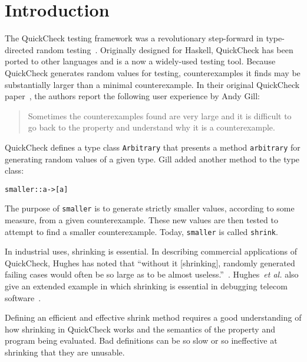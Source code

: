 \documentclass{sigplanconf}
\newenvironment{code}{\begin{alltt}\footnotesize}{\end{alltt}}
\newcommand{\ttp}[1]{\texttt{#1}}
\begin{document}
\section{Introduction}\label{sec:intro}
The QuickCheck testing framework was a revolutionary step-forward in
type-directed random testing~\cite{qc,monadic}.  Originally designed for Haskell,
QuickCheck has been ported to other languages and is a now a widely-used testing
tool.  Because QuickCheck generates random values for testing, counterexamples
it finds may be substantially larger than a minimal counterexample.  In their
original QuickCheck paper~\cite{qc}, the authors report the following user
experience by Andy Gill:
%
\begin{quote}
Sometimes the counterexamples found are very large and it is difficult to go
back to the property and understand why it is a counterexample.
\end{quote}
%
\noindent
QuickCheck defines a type class \ttp{Arbitrary} that presents a method
\ttp{arbitrary} for generating random values of a given type.  Gill added another
method to the type class:
%
\begin{code}
smaller :: a -> [a]
\end{code}
%
\noindent
The purpose of \ttp{smaller} is to generate strictly smaller values, according
to some measure, from a given counterexample.  These new values are then tested
to attempt to find a smaller counterexample.  Today, \ttp{smaller} is called
\ttp{shrink}.

In industrial uses, shrinking is essential.  In describing commercial
applications of QuickCheck, Hughes has noted that ``without it [shrinking],
randomly generated failing cases would often be so large as to be almost
useless.''~\cite{qcjh}.  Hughes~\emph{et al.} also give an extended example in
which shrinking is essential in debugging telecom software~\cite{telecom}.

Defining an efficient and effective shrink method requires a good understanding
of how shrinking in QuickCheck works and the semantics of the property and
program being evaluated.  Bad definitions can be so slow or so ineffective at
shrinking that they are unusable.
\end{document}
